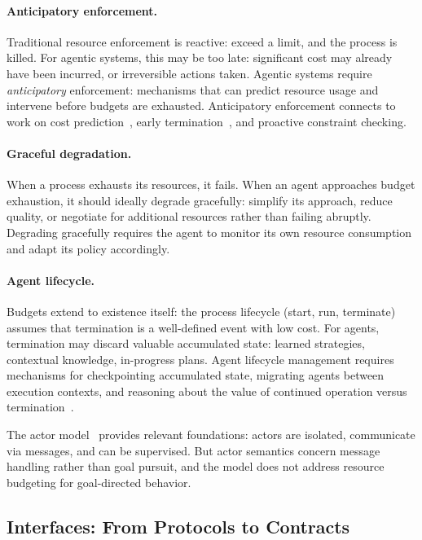 \documentclass[11pt]{article}
\begin{document}
\paragraph{Anticipatory enforcement.} Traditional resource enforcement is reactive: exceed a limit, and the process is killed. For agentic systems, this may be too late: significant cost may already have been incurred, or irreversible actions taken. Agentic systems require \textit{anticipatory} enforcement: mechanisms that can predict resource usage and intervene before budgets are exhausted. Anticipatory enforcement connects to work on cost prediction~\cite{tsafrir_backfilling,frugalgpt}, early termination~\cite{eet_termination}, and proactive constraint checking.

\paragraph{Graceful degradation.} When a process exhausts its resources, it fails. When an agent approaches budget exhaustion, it should ideally degrade gracefully: simplify its approach, reduce quality, or negotiate for additional resources rather than failing abruptly. Degrading gracefully requires the agent to monitor its own resource consumption and adapt its policy accordingly.

\paragraph{Agent lifecycle.} Budgets extend to existence itself: the process lifecycle (start, run, terminate) assumes that termination is a well-defined event with low cost. For agents, termination may discard valuable accumulated state: learned strategies, contextual knowledge, in-progress plans. Agent lifecycle management requires mechanisms for checkpointing accumulated state, migrating agents between execution contexts, and reasoning about the value of continued operation versus termination~\cite{agentops_survey,kamatar_academy}.

The actor model~\cite{hewitt_actors} provides relevant foundations: actors are isolated, communicate via messages, and can be supervised. But actor semantics concern message handling rather than goal pursuit, and the model does not address resource budgeting for goal-directed behavior.

\subsection{Interfaces: From Protocols to Contracts}
\label{sec:contracts}
\end{document}
